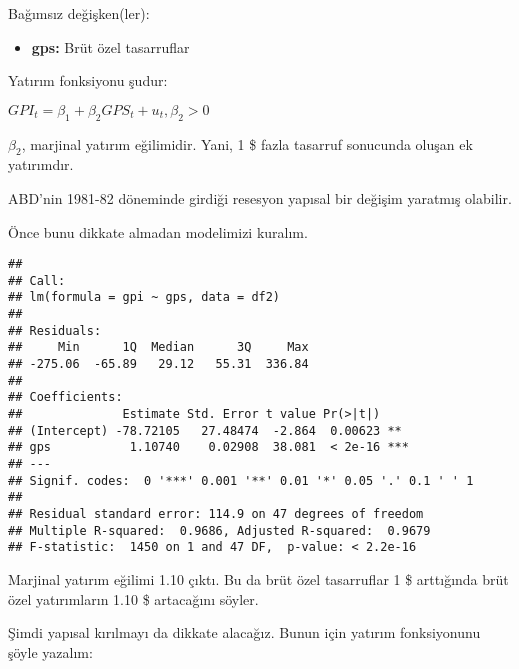 \documentclass[
]{book}
\newenvironment{Shaded}{\begin{snugshade}}{\end{snugshade}}
\newcommand{\DataTypeTok}[1]{\textcolor[rgb]{0.13,0.29,0.53}{#1}}
\newcommand{\DecValTok}[1]{\textcolor[rgb]{0.00,0.00,0.81}{#1}}
\newcommand{\KeywordTok}[1]{\textcolor[rgb]{0.13,0.29,0.53}{\textbf{#1}}}
\newcommand{\NormalTok}[1]{#1}
\newcommand{\OperatorTok}[1]{\textcolor[rgb]{0.81,0.36,0.00}{\textbf{#1}}}
\newcommand{\StringTok}[1]{\textcolor[rgb]{0.31,0.60,0.02}{#1}}
\providecommand{\tightlist}{%
  \setlength{\itemsep}{0pt}\setlength{\parskip}{0pt}}
\begin{document}
Bağımsız değişken(ler):

\begin{itemize}
\tightlist
\item
  \textbf{gps:} Brüt özel tasarruflar
\end{itemize}

Yatırım fonksiyonu şudur:

\(GPI_t = \beta_1 + \beta_2GPS_t + u_t, \beta_2 > 0\)

\(\beta_2\), marjinal yatırım eğilimidir. Yani, 1 \$ fazla tasarruf sonucunda oluşan ek yatırımdır.

ABD'nin 1981-82 döneminde girdiği resesyon yapısal bir değişim yaratmış olabilir.

Önce bunu dikkate almadan modelimizi kuralım.

\begin{Shaded}
\end{Shaded}

\begin{verbatim}
## 
## Call:
## lm(formula = gpi ~ gps, data = df2)
## 
## Residuals:
##     Min      1Q  Median      3Q     Max 
## -275.06  -65.89   29.12   55.31  336.84 
## 
## Coefficients:
##              Estimate Std. Error t value Pr(>|t|)    
## (Intercept) -78.72105   27.48474  -2.864  0.00623 ** 
## gps           1.10740    0.02908  38.081  < 2e-16 ***
## ---
## Signif. codes:  0 '***' 0.001 '**' 0.01 '*' 0.05 '.' 0.1 ' ' 1
## 
## Residual standard error: 114.9 on 47 degrees of freedom
## Multiple R-squared:  0.9686, Adjusted R-squared:  0.9679 
## F-statistic:  1450 on 1 and 47 DF,  p-value: < 2.2e-16
\end{verbatim}

Marjinal yatırım eğilimi 1.10 çıktı. Bu da brüt özel tasarruflar 1 \$ arttığında brüt özel yatırımların 1.10 \$ artacağını söyler.

Şimdi yapısal kırılmayı da dikkate alacağız. Bunun için yatırım fonksiyonunu şöyle yazalım:
\end{document}
